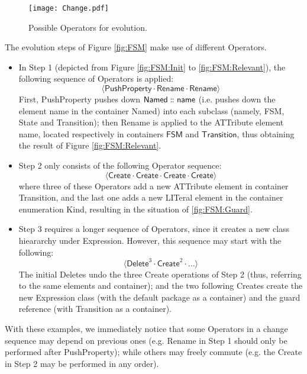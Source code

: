 \begin{figure}[t]
    \centering
    \texttt{[image: Change.pdf]}
    \caption{Possible \textsf{Operator}s for \metamodel evolution.}
    \label{fig:Operator}
\end{figure}

The evolution steps of Figure \ref{fig:FSM} make use of different \textsf{Operator}s.
\begin{itemize}
	\item In Step 1 (depicted from Figure \ref{fig:FSM:Init} to \ref{fig:FSM:Relevant}),
	the following sequence of \textsf{Operator}s is applied:
	$$\langle \mathsf{PushProperty} \cdot \mathsf{Rename} \cdot \mathsf{Rename} \rangle$$
	First, \textsf{PushProperty} pushes down $\mathsf{Named} \,\colon\!\!\!\colon \mathsf{name}$
	(i.e. pushes down the \textsf{element} \textsf{name} in the \textsf{container}
	\textsf{Named})
	into each subclass (namely, \textsf{FSM}, \textsf{State} and \textsf{Transition});
	then \textsf{Rename} is applied to the \textsf{ATT}ribute \textsf{element} 
	\textsf{name}, located respectively in \textsf{container}s $\mathsf{FSM}$ and 
	$\mathsf{Transition}$, thus obtaining the result of Figure \ref{fig:FSM:Relevant}.
	
	\item Step 2 only consists of the following \textsf{Operator} sequence:
	$$\langle \mathsf{Create} \cdot \mathsf{Create} \cdot \mathsf{Create} \cdot \mathsf{Create} \rangle$$
	where three of these \textsf{Operator}s add a new \textsf{ATT}ribute \textsf{element}
	in \textsf{container} \textsf{Transition}, and the last one adds a new 
	\textsf{LIT}eral \textsf{element} in the \textsf{container} enumeration \textsf{Kind},
	resulting in the situation of \autoref{fig:FSM:Guard}.
	
	\item Step 3 requires a longer sequence of \textsf{Operator}s, since it creates
	a new class hieararchy under \textsf{Expression}. However, this sequence may
	start with the following:
	$$\langle \mathsf{Delete}^3 \cdot \mathsf{Create}^2 \cdot \ldots \rangle$$
	The initial \textsf{Delete}s undo the three \textsf{Create} operations of Step 2
	(thus, referring to the same \textsf{element}s and \textsf{container}); and
	the two following \textsf{Create}s create the new \textsf{Expression} class
	(with the default package as a \textsf{container}) and the \textsf{guard}
	reference (with \textsf{Transition} as a \textsf{container}).
\end{itemize}
With these examples, we immediately notice that some \textsf{Operator}s
in a change sequence may depend on previous ones (e.g. \textsf{Rename}
in Step 1 should only be performed after \textsf{PushProperty}); while others
may freely commute (e.g. the \textsf{Create} in Step 2 may be performed in any 
order).